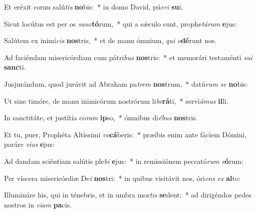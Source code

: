 \item Et eréxit cornu salú\textit{tis} \textbf{no}bis:~* in domo David, pú\textit{e}\textit{ri} \textbf{su}i.
\item Sicut locútus est per os \textit{sanc}\textbf{tó}rum,~* qui a sǽculo sunt, prophe\textit{tá}\textit{rum} \textbf{e}jus:
\item Salútem ex inimí\textit{cis} \textbf{nos}tris,~* et de manu ómnium, \textit{qui} \textit{o}\textbf{dé}runt nos.
\item Ad faciéndam misericórdiam cum pátri\textit{bus} \textbf{nos}tris:~* et memorári testaménti \textit{su}\textit{i} \textbf{sanc}ti.
\item Jusjurándum, quod jurávit ad Abraham pa\textit{trem} \textbf{nos}trum,~* datú\textit{rum} \textit{se} \textbf{no}bis:
\item Ut sine timóre, de manu inimicórum nostrórum li\textit{be}\textbf{rá}ti,~* servi\textit{á}\textit{mus} \textbf{il}li.
\item In sanctitáte, et justítia co\textit{ram} \textbf{ip}so,~* ómnibus di\textit{é}\textit{bus} \textbf{nos}tris.
\item Et tu, puer, Prophéta Altíssimi \textit{vo}\textbf{cá}beris:~* præíbis enim ante fáciem Dómini, paráre \textit{vi}\textit{as} \textbf{e}jus:
\item Ad dandam sciéntiam salútis ple\textit{bi} \textbf{e}jus:~* in remissiónem peccató\textit{rum} \textit{e}\textbf{ó}rum:
\item Per víscera misericórdiæ De\textit{i} \textbf{nos}tri:~* in quibus visitávit nos, óri\textit{ens} \textit{ex} \textbf{al}to:
\item Illumináre his, qui in ténebris, et in umbra mor\textit{tis} \textbf{se}dent:~* ad dirigéndos pedes nostros in \textit{vi}\textit{am} \textbf{pa}cis.
